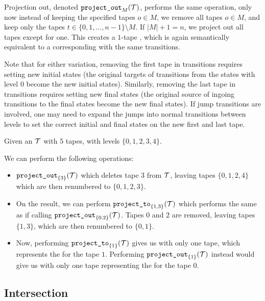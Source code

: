 Projection out, denoted $\texttt{project\_out}_{M}(\mathcal{T})$, performs the same operation, only now instead of keeping the specified tapes $o \in M$, we remove all tapes $o \in M$, and keep only the tapes $t \in \{ 0, 1, \ldots, n - 1 \} \setminus M$.
If $|M| + 1 = n$, we project out all tapes except for one.
This creates a $1$-tape \nft, which is again semantically equivalent to a corresponding \nfa with the same transitions.

Note that for either variation, removing the first tape in \nft transitions requires setting new initial states (the original targets of transitions from the states with level $0$ become the new initial states).
Similarly, removing the last tape in \nft transitions requires setting new final states (the original source of ingoing transitions to the final states become the new final states).
If jump transitions are involved, one may need to expand the jumps into normal transitions between levels to set the correct initial and final states on the new first and last tape.

\begin{example}
  Given an \nft $\mathcal{T}$ with $5$ tapes, with levels $\{ 0, 1, 2, 3, 4 \}$.

  We can perform the following operations:
  \begin{itemize}
    \item $\texttt{project\_out}_{\{ 3 \}}(\mathcal{T})$ which deletes tape $3$ from $\mathcal{T}$, leaving tapes $\{ 0, 1, 2, 4 \}$ which are then renumbered to $\{ 0, 1, 2, 3 \}$.
    \item On the result, we can perform $\texttt{project\_to}_{\{ 1, 3 \}}(\mathcal{T})$ which performs the same as if calling $\texttt{project\_out}_{\{ 0, 2 \} }(\mathcal{T})$.
    Tapes $0$ and $2$ are removed, leaving tapes $\{ 1, 3 \}$, which are then renumbered to $\{ 0, 1 \}$.
    \item Now, performing $\texttt{project\_to}_{\{ 1 \}}(\mathcal{T})$ gives us \nft with only one tape, which represents the \nfa for the tape $1$.
    Performing $\texttt{project\_out}_{\{ 1 \}}(\mathcal{T})$ instead would give us \nft with only one tape representing the \nfa for the tape $0$.
  \end{itemize}

\end{example}

\subsection{Intersection}\label{sec:intersection}

